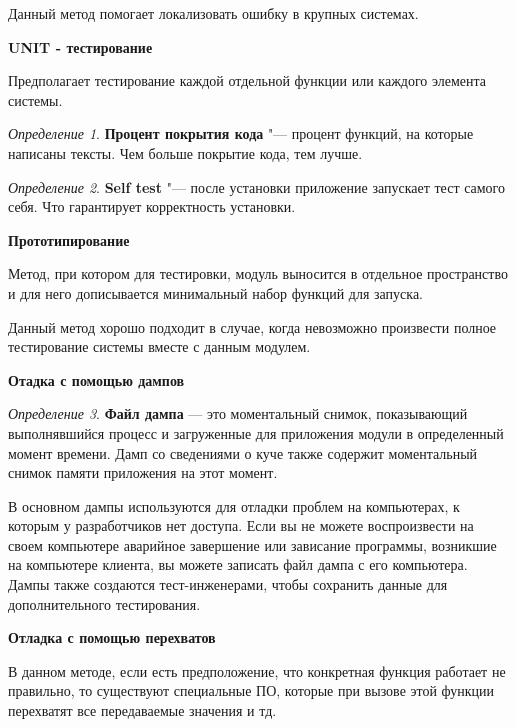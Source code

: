 \documentclass[bachelor, och, pract]{SCWorks}
\theoremstyle{remark}
\newtheorem{definition}{Определение}
\begin{document}
    Данный метод помогает локализовать ошибку в крупных системах.
    
    \hfill \break
    \textbf{UNIT - тестирование}
    
    Предполагает тестирование каждой отдельной функции или каждого элемента системы.

    \begin{definition}
        \textbf{Процент покрытия кода} "--- процент функций, на которые написаны тексты. Чем больше покрытие кода, тем лучше.
    \end{definition}

    \begin{definition}
        \textbf{Self test} "--- после установки приложение запускает тест самого себя. Что гарантирует корректность установки.
    \end{definition}

    \hfill \break
    \textbf{Прототипирование}
    
    Метод, при котором для тестировки, модуль выносится в отдельное пространство и для него дописывается минимальный набор функций для запуска. 

    Данный метод хорошо подходит в случае, когда невозможно произвести полное тестирование системы вместе с данным модулем.

    \hfill \break
    \hfill \break
    \textbf{Отадка с помощью дампов}
    
    \begin{definition}
        \textbf{Файл дампа} — это моментальный снимок, показывающий выполнявшийся процесс и загруженные для приложения модули в определенный момент времени. Дамп со сведениями о куче также содержит моментальный снимок памяти приложения на этот момент.
    \end{definition}

    В основном дампы используются для отладки проблем на компьютерах, к которым у разработчиков нет доступа. Если вы не можете воспроизвести на своем компьютере аварийное завершение или зависание программы, возникшие на компьютере клиента, вы можете записать файл дампа с его компьютера. Дампы также создаются тест-инженерами, чтобы сохранить данные для дополнительного тестирования.

    \hfill \break
    \textbf{Отладка с помощью перехватов}
    
    В данном методе, если есть предположение, что конкретная функция работает не правильно, то существуют специальные ПО, которые при вызове этой функции перехватят все передаваемые значения и тд. 
\end{document}
